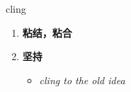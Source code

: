 
\begin{frame}
{\huge cling}
\begin{center}
\begin{enumerate}\Large
  \item \textbf{粘结，粘合}
  \item \textbf{坚持}
  \begin{itemize}
    \item \em{\Large{cling to the old idea}}
  \end{itemize}
\end{enumerate}
\end{center}
\end{frame}
